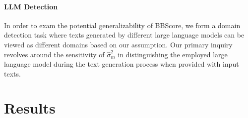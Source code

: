\documentclass[letterpaper]{article}
\begin{document}
\paragraph{LLM Detection} In order to exam the potential generalizability of BBScore, we form a domain detection task where texts generated by different large language models can be viewed as different domains based on our assumption. Our primary inquiry revolves around the sensitivity of $\hat\sigma^2_m$ in distinguishing the employed large language model during the text generation process when provided with input texts.

\section{Results}
\label{sec:results}

\begin{table}[ht]
\centering
\small
{}
\caption{Global Discrimination Task Results on WikiSection}
\label{wiki-global}
\end{table}
\end{document}
